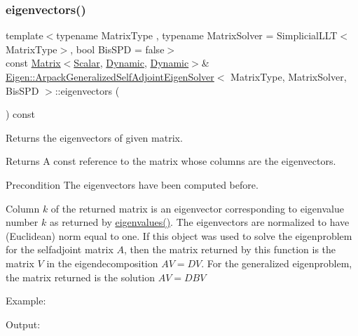 \subsubsection{\texorpdfstring{eigenvectors()}{eigenvectors()}\hspace{0.1cm}{\footnotesize\ttfamily [2/2]}}
{\footnotesize\ttfamily template$<$typename Matrix\+Type , typename Matrix\+Solver  = Simplicial\+L\+L\+T$<$\+Matrix\+Type$>$, bool Bis\+S\+PD = false$>$ \\
const \hyperlink{group___core___module_class_eigen_1_1_matrix}{Matrix}$<$\hyperlink{class_eigen_1_1_arpack_generalized_self_adjoint_eigen_solver_ab1182405bfe87a505d4b7a8311c661ec}{Scalar}, \hyperlink{namespace_eigen_ad81fa7195215a0ce30017dfac309f0b2}{Dynamic}, \hyperlink{namespace_eigen_ad81fa7195215a0ce30017dfac309f0b2}{Dynamic}$>$\& \hyperlink{class_eigen_1_1_arpack_generalized_self_adjoint_eigen_solver}{Eigen\+::\+Arpack\+Generalized\+Self\+Adjoint\+Eigen\+Solver}$<$ Matrix\+Type, Matrix\+Solver, Bis\+S\+PD $>$\+::eigenvectors (\begin{DoxyParamCaption}{ }\end{DoxyParamCaption}) const\hspace{0.3cm}{\ttfamily [inline]}}



Returns the eigenvectors of given matrix. 

\begin{DoxyReturn}{Returns}
A const reference to the matrix whose columns are the eigenvectors.
\end{DoxyReturn}
\begin{DoxyPrecond}{Precondition}
The eigenvectors have been computed before.
\end{DoxyPrecond}
Column $ k $ of the returned matrix is an eigenvector corresponding to eigenvalue number $ k $ as returned by \hyperlink{class_eigen_1_1_arpack_generalized_self_adjoint_eigen_solver_ab46900dafdd11a8ac05a662c6b41480d}{eigenvalues()}. The eigenvectors are normalized to have (Euclidean) norm equal to one. If this object was used to solve the eigenproblem for the selfadjoint matrix $ A $, then the matrix returned by this function is the matrix $ V $ in the eigendecomposition $ A V = D V $. For the generalized eigenproblem, the matrix returned is the solution $ A V = D B V $

Example\+: 
\begin{DoxyCodeInclude}
\end{DoxyCodeInclude}
 Output\+: 
\begin{DoxyVerbInclude}
\end{DoxyVerbInclude}


